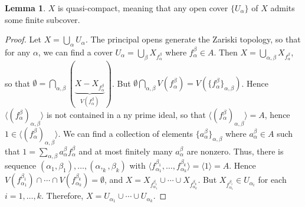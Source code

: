 \documentclass[10pt,letterpaper,cm]{nupset}
\theoremstyle{definition}
\newtheorem{lemma}{Lemma}
\newcommand{\1}{\mathbf{1}}
\newcommand{\0}{\vec 0}
\begin{document}
\begin{lemma}
$X$ is quasi-compact, meaning that any open cover $\{U_{\alpha}\}$ of $X$ admits some finite subcover. 
\end{lemma}
\begin{proof}
Let $X = \bigcup_{\alpha} U_{\alpha}$. The principal opens generate the Zariski topology, so that for any $\alpha$, we can find a cover $U_{\alpha} = \bigcup_{\beta} X_{f_{\alpha}^{\beta}}$ where $f_{\alpha}^{\beta}\in A$. Then $X = \bigcup_{\alpha, \beta} X_{f_{\alpha}^{\beta}}$, so that $\emptyset = \bigcap_{\alpha, \beta}(\underbrace{X - X_{f_{\alpha}^{\beta}}}_{V({f_{\alpha}^{\beta}})})$. But $\emptyset \bigcap_{\alpha, \beta} V({f_{\alpha}^{\beta}})= V(\{ {f_{\alpha}^{\beta}} \}_{\alpha, \beta})$. Hence $\langle ({f_{\alpha}^{\beta}})_{\alpha, \beta} \rangle$ is not contained in a ny prime ideal, so that $\langle ({f_{\alpha}^{\beta}})_{\alpha, \beta} \rangle =A$, hence $1\in \langle ({f_{\alpha}^{\beta}})_{\alpha, \beta} \rangle$. We can find a collection of elements $\{a_{\alpha}^{\beta} \}_{\alpha, \beta}$ where $a_{\alpha}^{\beta} \in A$ such that $1= \sum_{\alpha, \beta} a_{\alpha}^{\beta} f_{\alpha}^{\beta}$ and at most finitely many $a_{\alpha}^{\beta}$ are nonzero. Thus, there is sequence $(\alpha_1, \beta_1), \ldots, (\alpha,_k , \beta_k)$ with $\langle f_{\alpha_1}^{\beta_1}, \ldots, f_{\alpha_k}^{\beta_k} \rangle = \langle 1 \rangle = A$. Hence $V(f_{\alpha_1}^{\beta_1}) \cap \cdots \cap V(f_{\alpha_k}^{\beta_k}) = \emptyset$, and $X = X_{f_{\alpha_1}^{\beta_1}} \cup \cdots \cup X_{f_{\alpha_k}^{\beta_k}}$. But $X_{f_{\alpha_i}^{\beta_i}} \in U_{\alpha_i}$ for each $i=1, \ldots, k$. Therefore, $X= U_{\alpha_1} \cup \cdots \cup U_{\alpha_k}$.
\end{proof}
\end{document}
